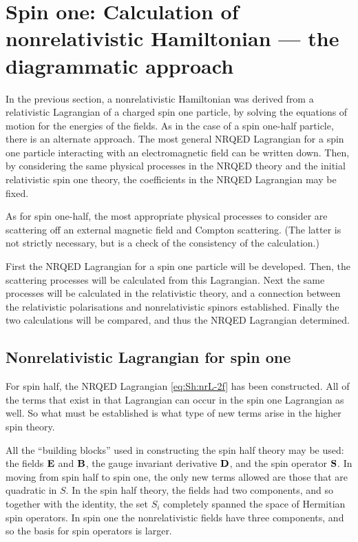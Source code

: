 \chapter{Spin one: Calculation of nonrelativistic Hamiltonian --- the diagrammatic approach}


In the previous section, a nonrelativistic Hamiltonian was derived from a relativistic Lagrangian of a charged spin one particle, by solving the equations of motion for the energies of the fields.  As in the case of a spin one-half particle, there is an alternate approach.  The most general NRQED Lagrangian for a spin one particle interacting with an electromagnetic field can be written down.  Then, by considering the same physical processes in the NRQED theory and the initial relativistic spin one theory, the coefficients in the NRQED Lagrangian may be fixed.

As for spin one-half, the most appropriate physical processes to consider are scattering off an external magnetic field and Compton scattering.  (The latter is not strictly necessary, but is a check of the consistency of the calculation.)

First the NRQED Lagrangian for a spin one particle will be developed.  Then, the scattering processes will be calculated from this Lagrangian.  Next the same processes will be calculated in the relativistic theory, and a connection between the relativistic polarisations and nonrelativistic spinors established.  Finally the two calculations will be compared, and thus the NRQED Lagrangian determined.  

\section{Nonrelativistic Lagrangian for spin one}

For spin half, the NRQED Lagrangian \eqref{eq:Sh:nrL-2f} has been constructed.  All of the terms that exist in that Lagrangian can occur in the spin one Lagrangian as well.  So what must be established is what type of new terms arise in the higher spin theory.

All the ``building blocks'' used in constructing the spin half theory may be used: the fields $\mathbf{E}$ and $\mathbf{B}$, the gauge invariant derivative $\mathbf{D}$, and the spin operator $\mathbf{S}$.  In moving from spin half to spin one, the only new terms allowed are those that are quadratic in $S$.  In the spin half theory, the fields had two components, and so together with the identity, the set $S_i$ completely spanned the space of Hermitian spin operators.  In spin one the nonrelativistic fields have three components, and so the basis for spin operators is larger.

